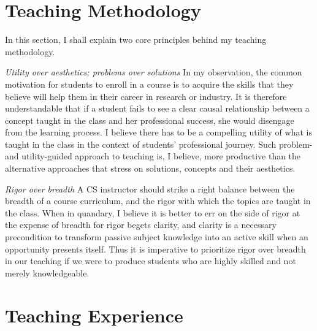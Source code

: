 \section*{Teaching Methodology}

In this section, I shall explain two core principles behind my
teaching methodology.

{\itshape\color{MidnightBlue} Utility over aesthetics; problems over
solutions} In my observation, the common motivation for students to
enroll in a course is to acquire the skills that they believe will
help them in their career in research or industry. It is therefore
understandable that if a student fails to see a clear causal
relationship between a concept taught in the class and her
professional success, she would disengage from the learning process. I
believe there has to be a compelling utility of what is taught in the
class in the context of students' professional journey. Such problem-
and utility-guided approach to teaching is, I believe, more productive
than the alternative approaches that stress on solutions, concepts and
their aesthetics.

{\itshape\color{MidnightBlue} Rigor over breadth} A CS instructor
should strike a right balance between the breadth of a course
curriculum, and the rigor with which the topics are taught in the
class. When in quandary, I believe it is better to err on the side of
rigor at the expense of breadth for rigor begets clarity, and clarity
is a necessary precondition to transform passive subject knowledge
into an active skill when an opportunity presents itself. Thus it is
imperative to prioritize rigor over breadth in our teaching if we were
to produce students who are highly skilled and not merely
knowledgeable.

\section*{Teaching Experience}


